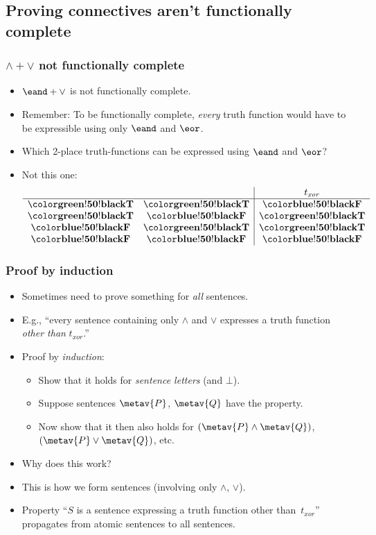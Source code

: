\subsection{Proving connectives aren't functionally complete}

\begin{frame}
  \frametitle{$\land + \lor$ not functionally complete}

\begin{itemize}[<+->]
\item $\eand + \lor$ is not functionally complete.
\item Remember: To be functionally complete, \emph{every} truth
  function would have to be expressible using only $\eand$ and $\eor$.
\item Which 2-place truth-functions can be expressed using $\eand$ and
  $\eor$?
\item Not this one:
\[
\begin{array}{cc|c}
  && t_{\mathit{xor}}\\ \hline
\True & \True & \False \\
\True & \False & \True \\
\False & \True & \True \\
\False & \False & \False
\end{array}
\]
\end{itemize}
\end{frame}

\begin{frame}
    \frametitle{Proof by induction}

\begin{itemize}[<+->]
\item Sometimes need to prove something for \emph{all} sentences.
\item E.g., ``every sentence containing only $\land$ and $\lor$ expresses a truth function \emph{other than} $t_\mathit{xor}$.''
\item Proof by \emph{induction}:
\begin{itemize}[<+->]
\item Show that it holds for \emph{sentence letters} (and $\bot$).
\item Suppose sentences \emph{$\metav{P}$}, \emph{$\metav{Q}$} have the property.
\item Now show that it then also holds for \emph{$(\metav{P} \land \metav{Q})$}, \emph{$(\metav{P} \lor \metav{Q})$}, etc.
\end{itemize}
\item Why does this work? 
\item This is how we form sentences (involving only $\land$, $\lor$).
\item Property ``$S$ is a sentence expressing a truth function other than~$t_\mathit{xor}$'' propagates from atomic sentences to all sentences.
\end{itemize}
\end{frame}

